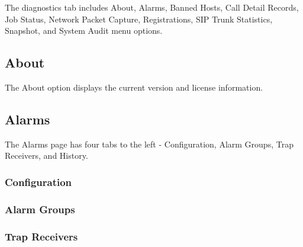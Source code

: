 \documentclass[letterpaper,10pt,english]{sphinxmanual}
\begin{document}
The diagnostics tab includes About, Alarms, Banned Hosts, Call Detail Records, Job Status, Network Packet Capture, Registrations, SIP Trunk Statistics, Snapshot, and System Audit menu options.


\subsection{About}
\label{\detokenize{webui:about}}\label{\detokenize{webui:diagnostics-about}}
The About option displays the current version and license information.
\begin{quote}

\end{quote}


\subsection{Alarms}
\label{\detokenize{webui:alarms}}\label{\detokenize{webui:diagnostics-alarms}}
The Alarms page has four tabs to the left - Configuration, Alarm Groups, Trap Receivers, and History.


\subsubsection{Configuration}
\label{\detokenize{webui:id60}}\begin{quote}

\end{quote}


\subsubsection{Alarm Groups}
\label{\detokenize{webui:alarm-groups}}\begin{quote}

\end{quote}


\subsubsection{Trap Receivers}
\label{\detokenize{webui:trap-receivers}}\begin{quote}

\end{quote}
\end{document}
